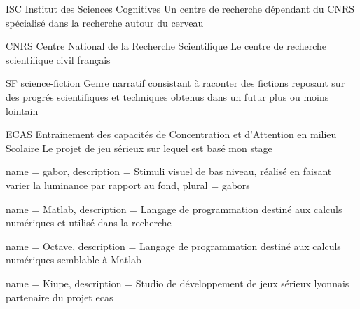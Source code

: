   {ISC}
  {Institut des Sciences Cognitives}
  {Un centre de recherche dépendant du \gls{CNRS} spécialisé dans la recherche autour du cerveau}

  {CNRS}
  {Centre National de la Recherche Scientifique}
  {Le centre de recherche scientifique civil français}

  {SF}
  {science-fiction}
  {Genre narratif consistant à raconter des fictions reposant sur des progrés scientifiques et techniques obtenus dans un futur plus ou moins lointain}

  {ECAS}
  {Entrainement des capacités de Concentration et d'Attention en milieu Scolaire}
  {Le projet de jeu sérieux sur lequel est basé mon stage} 

 {
  name = gabor,
  description = {Stimuli visuel de bas niveau, réalisé en faisant varier la luminance par rapport au fond},
  plural = gabors
}


 {
  name = Matlab,
  description = {Langage de programmation destiné aux calculs numériques et utilisé dans la recherche}
}

 {
  name = Octave,
  description = {Langage de programmation destiné aux calculs numériques semblable à \gls{Matlab}}
}

 {
  name = Kiupe,
  description = {Studio de développement de jeux sérieux lyonnais partenaire du projet \gls{ecas}}
}